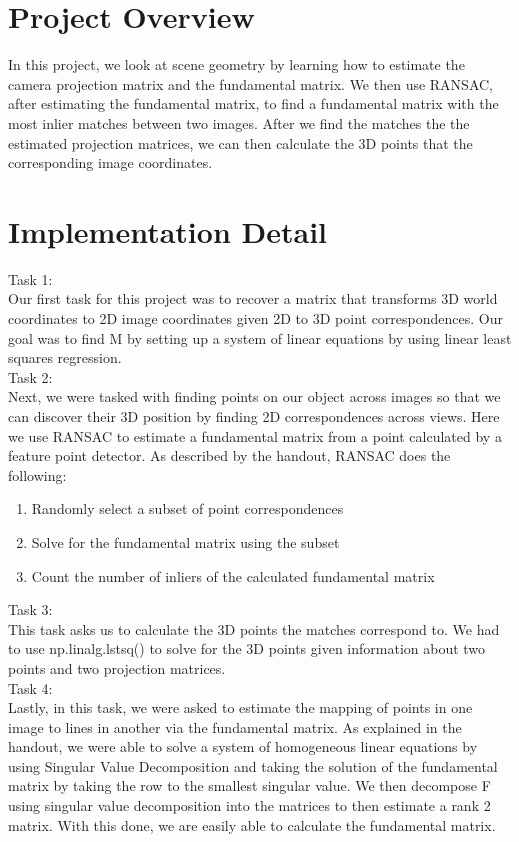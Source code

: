 \section*{Project Overview}

In this project, we look at scene geometry by learning how to estimate the camera projection matrix and the fundamental matrix. We then use RANSAC, after estimating the fundamental matrix, to find a fundamental matrix with the most inlier matches between two images. After we find the matches the the estimated projection matrices, we can then calculate the 3D points that the corresponding image coordinates.

\section*{Implementation Detail}
Task 1: \\
Our first task for this project was to recover a matrix that transforms 3D world coordinates to 2D image coordinates given 2D to 3D point correspondences. Our goal was to find M by setting up a system of linear equations by using linear least squares regression.\\

Task 2: \\
Next, we were tasked with finding points on our object across images so that we can discover their 3D position by finding 2D correspondences across views. Here we use RANSAC to estimate a fundamental matrix from a point calculated by a feature point detector. As described by the handout, RANSAC does the following:
\begin{enumerate}
  \item Randomly select a subset of point correspondences 
  \item Solve for the fundamental matrix using the subset
  \item Count the number of inliers of the calculated fundamental matrix
\end{enumerate} 

Task 3: \\
This task asks us to calculate the 3D points the matches correspond to. We had to use np.linalg.lstsq() to solve for the 3D points given information about two points and two projection matrices.\\

Task 4: \\
Lastly, in this task, we were asked to estimate the mapping of points in one image to lines in another via the fundamental matrix. As explained in the handout, we were able to solve a system of homogeneous linear equations by using Singular Value Decomposition and taking the solution of the fundamental matrix by taking the row to the smallest singular value. We then decompose F using singular value decomposition into the matrices to then estimate a rank 2 matrix. With this done, we are easily able to calculate the fundamental matrix.

